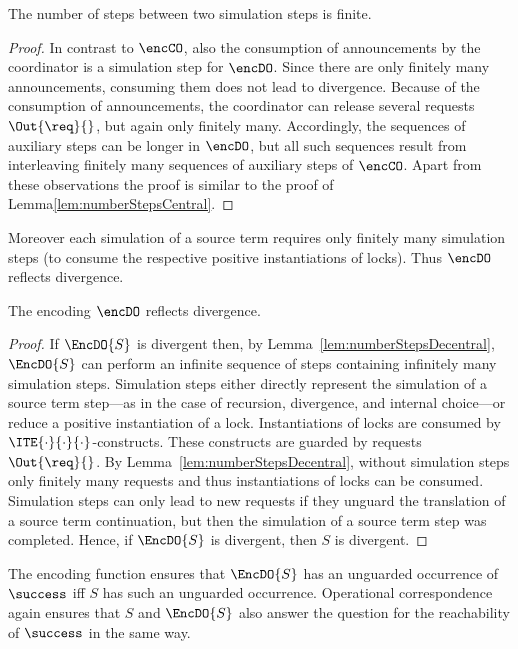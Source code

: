 \documentclass[]{eptcs}
\begin{document}
\begin{lemma}
	The number of steps between two simulation steps is finite.
	\label{lem:numberStepsDecentral}
\end{lemma}

\begin{proof}
	In contrast to $ \encCO $, also the consumption of announcements by the coordinator is a simulation step for $ \encDO $. Since there are only finitely many announcements, consuming them does not lead to divergence. Because of the consumption of announcements, the coordinator can release several requests $ \Out{\req}{} $, but again only finitely many. Accordingly, the sequences of auxiliary steps can be longer in $ \encDO $, but all such sequences result from interleaving finitely many sequences of auxiliary steps of $ \encCO $.
	Apart from these observations the proof is similar to the proof of Lemma\ref{lem:numberStepsCentral}.
\end{proof}

Moreover each simulation of a source term requires only finitely many simulation steps (to consume the respective positive instantiations of locks). Thus $ \encDO $ reflects divergence.

\begin{theorem}
	The encoding $ \encDO $ reflects divergence.
	\label{thm:divergenceReflectionDecentral}
\end{theorem}

\begin{proof}
	If $ \EncDO{S} $ is divergent then, by Lemma~\ref{lem:numberStepsDecentral}, $ \EncDO{S} $ can perform an infinite sequence of steps containing infinitely many simulation steps.
	Simulation steps either directly represent the simulation of a source term step---as in the case of recursion, divergence, and internal choice---or reduce a positive instantiation of a lock.
	Instantiations of locks are consumed by $ \ITE{\cdot}{\cdot}{\cdot} $-constructs. These constructs are guarded by requests $ \Out{\req}{} $.
	By Lemma~\ref{lem:numberStepsDecentral}, without simulation steps only finitely many requests and thus instantiations of locks can be consumed. Simulation steps can only lead to new requests if they unguard the translation of a source term continuation, but then the simulation of a source term step was completed.
	Hence, if $ \EncDO{S} $ is divergent, then $ S $ is divergent.
\end{proof}

The encoding function ensures that $ \EncDO{S} $ has an unguarded occurrence of $ \success $ iff $ S $ has such an unguarded occurrence. Operational correspondence again ensures that $ S $ and $ \EncDO{S} $ also answer the question for the reachability of $ \success $ in the same way.
\end{document}
